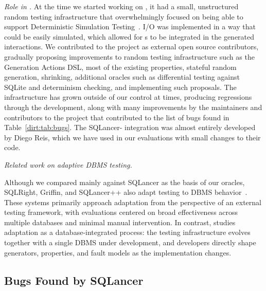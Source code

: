 \emph{Role in \db{}.}
At the time we started working on \db{}, it had a small, unstructured random testing
infrastructure that overwhelmingly focused on being able to support Deterministic
Simulation Testing~\cite{fdb}. I/O was implemented in a way that could be easily simulated,
which allowed for s to be integrated in the generated interactions.
We contributed to the project as external open source contributors, gradually
proposing improvements to random testing infrastructure such as the Generation Actions
DSL, most of the existing properties, stateful random generation, shrinking, additional
oracles such as differential testing against SQLite and determinism checking, and
implementing such proposals. The infrastructure has grown outside of our control at times,
producing regressions through the development, along with many improvements by the
maintainers and contributors to the project that contributed to the list of bugs
found in Table~\ref{dirt:tab:bugs}. The SQLancer-\db{} integration was almost entirely
developed by Diego Reis, which we have used in our evaluations with small changes
to their code.

\noindent\emph{Related work on adaptive DBMS testing.}

Although we compared \tool{} mainly against SQLancer as the basis of our oracles,
SQLRight, Griffin, and SQLancer++ also adapt testing to DBMS
behavior~\cite{sqlright,griffin,zhong2026scalingautomateddatabasetesting}. These
systems primarily approach adaptation from the perspective of an external testing
framework, with evaluations centered on broad effectiveness across multiple databases
and minimal manual intervention. In contrast, \tool{} studies adaptation as a
database-integrated process: the testing infrastructure evolves together with a single
DBMS under development, and developers directly shape generators, properties, and fault
models as the implementation changes.

\subsection{Bugs Found by SQLancer} \label{dirt:app:sqlancer-bugs}

